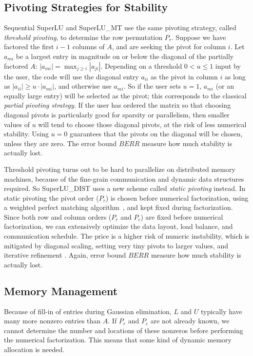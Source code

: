 \subsection{Pivoting Strategies for Stability}

Sequential SuperLU and SuperLU\_MT use the same pivoting strategy, called
{\em threshold pivoting}, to determine the row permutation $P_r$.
Suppose we have factored the first
$i-1$ columns of $A$, and are seeking the pivot for column $i$.
Let $a_{mi}$ be a largest
entry in magnitude on or below the diagonal of the partially
factored $A$: $|a_{mi}| = \max_{j \geq i} |a_{ji}|$.
Depending on a threshold $0 < u \leq 1$
input by the user, the code will use the diagonal entry
$a_{ii}$ as the pivot in column $i$ as long as 
$|a_{ii}| \geq u \cdot |a_{mi}|$, and otherwise use $a_{mi}$.
So if the user sets $u=1$, $a_{mi}$ (or an equally large entry)
will be selected as the pivot;
this corresponds to the classical {\em partial pivoting strategy}.
If the user has ordered the matrix so that choosing diagonal pivots
is particularly good for sparsity or parallelism, then
smaller values of $u$ will tend to choose those diagonal pivots,
at the risk of less numerical stability.
Using $u=0$ guarantees that the pivots on the diagonal will 
be chosen, unless they are zero.
The error bound $BERR$ measure how much stability is actually lost.

Threshold pivoting turns out to be hard to parallelize on
distributed memory machines, because of the fine-grain communication
and dynamic data structures required. So SuperLU\_DIST uses a
new scheme called {\em static pivoting} instead. In static pivoting
the pivot order ($P_r$) is chosen before numerical factorization,
using a weighted perfect matching algorithm~\cite{duffkoster99},
and kept fixed during factorization. Since both row and column orders
($P_r$ and $P_c$) are fixed before numerical factorization, we can
extensively optimize the data layout, load balance, and communication
schedule. The price is a higher risk of numeric instability,
which is mitigated by diagonal scaling, setting very tiny pivots
to larger values, and iterative refinement \cite{lidemmel03}.
Again, error bound $BERR$ measure how much stability is actually lost.

\subsection{Memory Management}

Because of fill-in of entries during Gaussian elimination,
$L$ and $U$ typically have many more nonzero entries than $A$.
If $P_r$ and $P_c$ are not already known, we cannot determine
the number and locations of these nonzeros before performing 
the numerical factorization. This means that some kind of
dynamic memory allocation is needed.

